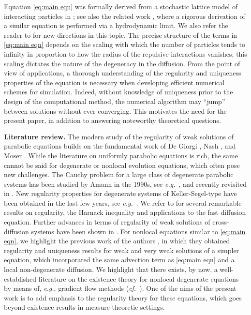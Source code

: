 \documentclass[11pt,a4paper,reqno]{amsart}
\theoremstyle{remark}
\theoremstyle{definition}
\numberwithin{equation}{section}
\begin{document}
Equation \eqref{eq:main eqn} was formally derived from a stochastic lattice model of interacting particles in \cite{bbes model}; see also the related work \cite{JamesMariaErignoux}, where a rigorous derivation of a similar equation is performed via a hydrodynamic limit. We also refer the reader to \cite{BrunaBurgerDeWit} for new directions in this topic. The precise structure of the terms in \eqref{eq:main eqn} depends on the scaling with which the number of particles tends to infinity in proportion to how the radius of the repulsive interactions vanishes; this scaling dictates the nature of the degeneracy in the diffusion. From the point of view of applications, a thorough understanding of the regularity and uniqueness properties of the equation is necessary when developing efficient numerical schemes for simulation. Indeed, without knowledge of uniqueness prior to the design of the computational method, the numerical algorithm may ``jump'' between solutions without ever converging. This motivates the need for the present paper, in addition to answering noteworthy theoretical questions. 

\noindent\textbf{Literature review.}
The modern study of the regularity of weak solutions of parabolic equations builds on the fundamental work of De Giorgi \cite{degiorgi1}, Nash \cite{nash1}, and Moser \cite{moser1}. While the literature on uniformly parabolic equations is rich, the same cannot be said for degenerate or nonlocal evolution equations, which often pose new challenges. 
The Cauchy problem for a large class of degenerate parabolic systems has been studied by Amann in the 1990s, see \textit{e.g.}~\cite{Amann}, and recently revisited in \cite{MoussaGallagher}.
New regularity properties for degenerate systems of Keller-Segel-type have been obtained in the last few years, see \textit{e.g.}~\cite{DesvillettesLaurencotEtAl,  WinklerRefinedReg, WinklerOrlicz}. We refer to \cite{BonforteDolbeaultNazaretSimonov} for several remarkable results on regularity, the Harnack inequality and applications to the fast diffusion equation. Further advances in terms of regularity of weak solutions of cross-diffusion systems have been shown in \cite{DungLe,LMSS}. For nonlocal equations similar to \eqref{eq:main eqn}, we highlight the previous work of the authors \cite{reg1}, in which they obtained regularity and uniqueness results for weak and very weak solutions of a simpler equation, which incorporated the same advection term as \eqref{eq:main eqn} and a local non-degenerate diffusion. We highlight that there exists, by now, a well-established literature on the existence theory for nonlocal degenerate equations by means of, \textit{e.g.}, gradient flow methods (\textit{cf.~}\cite{AGS,Filippo}). One of the aims of the present work is to add emphasis to the regularity theory for these equations, which goes beyond existence results in measure-theoretic settings. 
\end{document}
